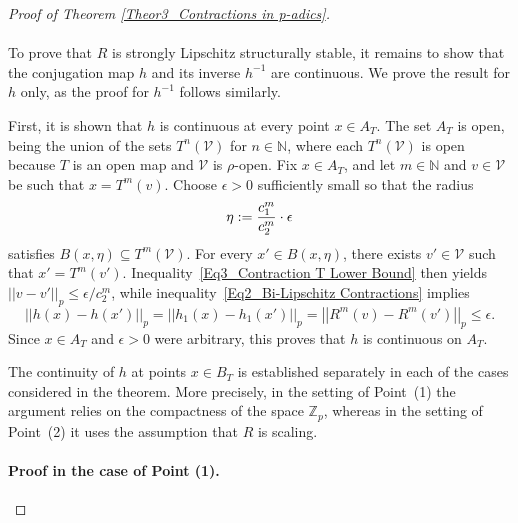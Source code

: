 \documentclass[a4paper, 12pt]{article}
\theoremstyle{definition}
\begin{document}
\begin{proof}[Proof of Theorem \ref{Theor3_Contractions in p-adics}]
		
		
		\paragraph{} 
		
		To prove that $R$ is strongly Lipschitz structurally stable, it remains to show that the conjugation map $h$ and its inverse $h^{-1}$ are continuous. 
		We prove the result for $h$ only, as the proof for $h^{-1}$ follows similarly. 
		
		\medskip
		
		First, it is shown that $h$ is continuous at every point $x \in A_{T}$. The set $A_{T}$ is open, being the union of the sets $T^{n} \left(  \mathcal{V}  \right) $ for $n \in \mathbb{N} $, where each $T^{n} \left(  \mathcal{V}  \right)  $ is open because $T$ is an open map and $\mathcal{V}$ is $\rho$-open. 
		Fix $x \in A_{T} $, and let $m \in \mathbb{N} $ and $v \in \mathcal{V}$ be such that $x = T^{m}(v)$. Choose $  \epsilon > 0$ sufficiently small so that the radius 
		$$  \eta :=   {c_{1}^{m} \over c_{2}^{m}} \cdot  \epsilon $$
		satisfies $B \left(  x,  \eta  \right)  \subseteq T^{m} \left(  \mathcal{V}  \right)  $. 
		For every $x' \in B \left(  x ,  \eta  \right) $, there exists $v' \in \mathcal{V}$ such that $x' = T^{m} \left(  v'  \right) $. Inequality~\eqref{Eq3_Contraction T Lower Bound} then yields  $ \left| \left|  v - v'  \right|  \right|_{p} \le \epsilon / c_{2}^{m}$, while inequality~\eqref{Eq2_Bi-Lipschitz Contractions} implies  
		$$  \left| \left|  h \left(  x  \right)  - h \left(  x'  \right)   \right|  \right|_{p}   =    \left| \left|  h_{1}(x) - h_{1} \left(  x' \right)   \right|  \right|_{p}   =    \left| \left|  R^{m} \left(  v  \right)  - R^{m} \left(  v'  \right)   \right|  \right|_{p}   \le    \epsilon . $$ 	
		Since $x \in A_{T}$ and $\epsilon  > 0$ were arbitrary, this proves that $h$ is continuous on $A_{T}$. 
		
		
		\medskip
		
		The continuity of $h$ at points $x \in B_{T}$ is established separately in each of the cases considered in the theorem. More precisely, in the setting of Point~(1) the argument relies on the compactness of the space $\mathbb{Z}_{p}$, whereas in the setting of Point~(2) it uses the assumption that $R$ is scaling.
		
		
		\paragraph{Proof in the case of Point (1).} 
		

\end{proof}
\end{document}
